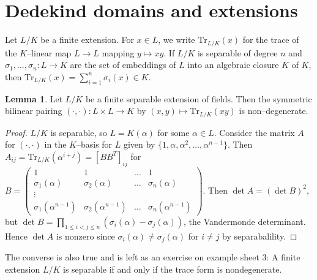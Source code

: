 \documentclass{article}
\theoremstyle{definition}
\newtheorem{lemma}[theorem]{Lemma}
\begin{document}
\section{Dedekind domains and extensions}

Let $L/K$ be a finite extension. For $x \in L$, we write $\text{Tr}_{L/K}(x)$ for the trace of the $K$--linear map $L \to L$ mapping $y \mapsto xy$. If $L/K$ is separable of degree $n$ and $\sigma_1,\ldots,\sigma_n : L \to \overline{K}$ are the set of embeddings of $L$ into an algebraic closure $\overline{K}$ of $K$, then $\text{Tr}_{L/K}(x)=\sum_{i=1}^{n} \sigma_i(x) \in K$.

\begin{lemma}
    Let $L/K$ be a finite separable extension of fields. Then the symmetric bilinear pairing $(\cdot ,\cdot ) : L \times L \to K$ by $(x,y) \mapsto \text{Tr}_{L/K}(xy)$ is non--degenerate.
\end{lemma}
\begin{proof}
    $L/K$ is separable, so $L=K(\alpha)$ for some $\alpha \in L$. Consider the matrix $A$ for $(\cdot ,\cdot )$ in the $K$--basis for $L$ given by $\{1,\alpha,\alpha^2,\ldots,\alpha^{n-1}\}$. Then $A_{ij} = \text{Tr}_{L/K}(\alpha^{i+j}) = [BB^T]_{ij}$ for $B = \begin{pmatrix} 1 & 1 & \ldots & 1 \\
    \sigma_1(\alpha) & \sigma_2(\alpha) & \ldots & \sigma_n(\alpha) \\
\vdots & & \\
\sigma_1(\alpha^{n-1}) & \sigma_2(\alpha^{n-1}) & \ldots & \sigma_n(\alpha^{n-1}) \end{pmatrix}$. Then $\det A =(\det B)^2$, but $\det B = \prod_{1\le i < j\le n}^{} (\sigma_i(\alpha)-\sigma_j(\alpha))$, the Vandermonde determinant. Hence $\det A$ is nonzero since $\sigma_i(\alpha) \neq \sigma_j(\alpha)$ for $i \neq j$ by separabalility.
\end{proof}
The converse is also true and is left as an exercise on example sheet 3: A finite extension $L/K$ is separable if and only if the trace form is nondegenerate.
\end{document}
